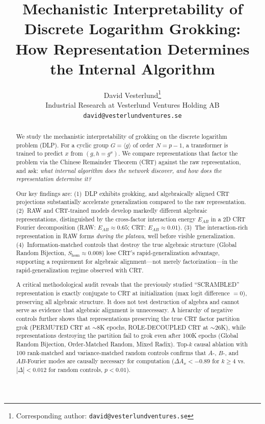 \documentclass[11pt,a4paper]{article}
\title{Mechanistic Interpretability of Discrete Logarithm Grokking: \\
How Representation Determines the Internal Algorithm}
\author{David Vesterlund\thanks{Corresponding author: \texttt{david@vesterlundventures.se}} \\
Industrial Research at Vesterlund Ventures Holding AB \\
\texttt{david@vesterlundventures.se}}
\theoremstyle{definition}
\theoremstyle{remark}
\newcommand{\Shom}{S_{\mathrm{hom}}}
\newcommand{\EAB}{E_{AB}}
\begin{document}
\maketitle

\begin{abstract}
We study the mechanistic interpretability of grokking on the discrete logarithm problem (DLP). For a cyclic group $G = \langle g \rangle$ of order $N = p - 1$, a transformer is trained to predict $x$ from $(g, h = g^x)$. We compare representations that factor the problem via the Chinese Remainder Theorem (CRT) against the raw representation, and ask: \emph{what internal algorithm does the network discover, and how does the representation determine it?}

Our key findings are: (1)~DLP exhibits grokking, and algebraically aligned CRT projections substantially accelerate generalization compared to the raw representation. (2)~RAW and CRT-trained models develop markedly different algebraic representations, distinguished by the cross-factor interaction energy $\EAB$ in a 2D CRT Fourier decomposition (RAW: $\EAB \approx 0.65$; CRT: $\EAB \approx 0.01$). (3)~The interaction-rich representation in RAW forms \emph{during the plateau}, well before visible generalization. (4)~Information-matched controls that destroy the true algebraic structure (Global Random Bijection, $\Shom \approx 0.008$) lose CRT's rapid-generalization advantage, supporting a requirement for algebraic alignment---not merely factorization---in the rapid-generalization regime observed with CRT.

A critical methodological audit reveals that the previously studied ``SCRAMBLED'' representation is exactly conjugate to CRT at initialization (max logit difference $= 0$), preserving all algebraic structure. It does not test destruction of algebra and cannot serve as evidence that algebraic alignment is unnecessary. A hierarchy of negative controls further shows that representations preserving the true CRT factor partition grok (PERMUTED CRT at $\sim$8K epochs, ROLE-DECOUPLED CRT at $\sim$26K), while representations destroying the partition fail to grok even after 100K epochs (Global Random Bijection, Order-Matched Random, Mixed Radix). Top-$k$ causal ablation with 100 rank-matched and variance-matched random controls confirms that $A$-, $B$-, and $AB$-Fourier modes are causally necessary for computation ($\Delta A_x < -0.89$ for $k \geq 4$ vs.\ $|\Delta| < 0.012$ for random controls, $p < 0.01$).
\end{abstract}
\end{document}
